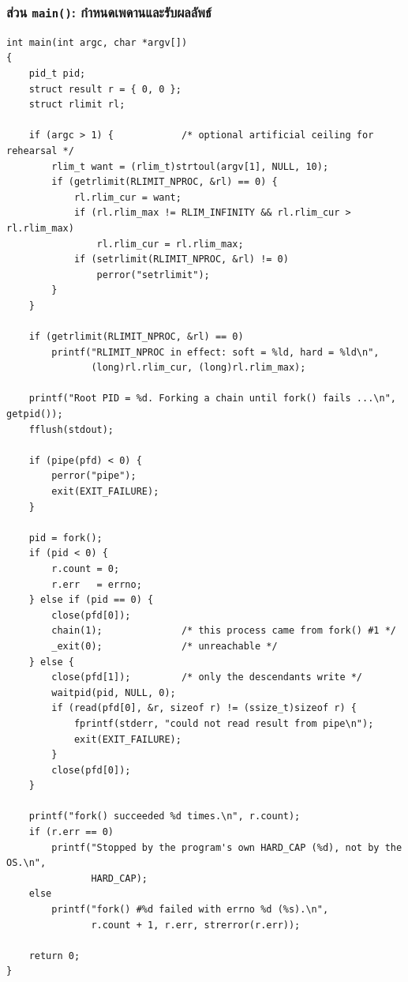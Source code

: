 \documentclass[a4paper,12pt]{article}
\newcommand{\code}[1]{\texttt{#1}}
\begin{document}
\newpage

\subsubsection{ส่วน \code{main()}: กำหนดเพดานและรับผลลัพธ์}

\begin{lstlisting}[caption={q3\_forkcount.c -- main(): optional ceiling and result collection},label={lst:q3b}]
int main(int argc, char *argv[])
{
    pid_t pid;
    struct result r = { 0, 0 };
    struct rlimit rl;

    if (argc > 1) {            /* optional artificial ceiling for rehearsal */
        rlim_t want = (rlim_t)strtoul(argv[1], NULL, 10);
        if (getrlimit(RLIMIT_NPROC, &rl) == 0) {
            rl.rlim_cur = want;
            if (rl.rlim_max != RLIM_INFINITY && rl.rlim_cur > rl.rlim_max)
                rl.rlim_cur = rl.rlim_max;
            if (setrlimit(RLIMIT_NPROC, &rl) != 0)
                perror("setrlimit");
        }
    }

    if (getrlimit(RLIMIT_NPROC, &rl) == 0)
        printf("RLIMIT_NPROC in effect: soft = %ld, hard = %ld\n",
               (long)rl.rlim_cur, (long)rl.rlim_max);

    printf("Root PID = %d. Forking a chain until fork() fails ...\n", getpid());
    fflush(stdout);

    if (pipe(pfd) < 0) {
        perror("pipe");
        exit(EXIT_FAILURE);
    }

    pid = fork();
    if (pid < 0) {
        r.count = 0;
        r.err   = errno;
    } else if (pid == 0) {
        close(pfd[0]);
        chain(1);              /* this process came from fork() #1 */
        _exit(0);              /* unreachable */
    } else {
        close(pfd[1]);         /* only the descendants write */
        waitpid(pid, NULL, 0);
        if (read(pfd[0], &r, sizeof r) != (ssize_t)sizeof r) {
            fprintf(stderr, "could not read result from pipe\n");
            exit(EXIT_FAILURE);
        }
        close(pfd[0]);
    }

    printf("fork() succeeded %d times.\n", r.count);
    if (r.err == 0)
        printf("Stopped by the program's own HARD_CAP (%d), not by the OS.\n",
               HARD_CAP);
    else
        printf("fork() #%d failed with errno %d (%s).\n",
               r.count + 1, r.err, strerror(r.err));

    return 0;
}
\end{lstlisting}
\end{document}
